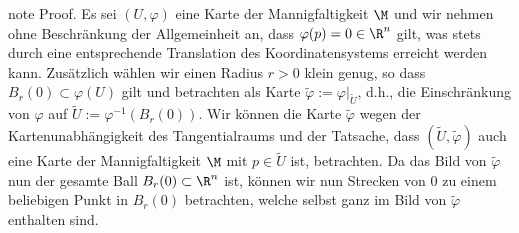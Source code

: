 \documentclass[letterpaper,10pt,german]{jupyterBook}
\begin{document}
\begin{sphinxadmonition}{note}
\sphinxAtStartPar
Proof. Es sei \((U,\varphi)\) eine Karte der Mannigfaltigkeit \(\M\) und wir nehmen ohne Beschränkung der Allgemeinheit an, dass \(\varphi(p)=0 \in \R^n\) gilt, was stets durch eine entsprechende Translation des Koordinatensystems erreicht werden kann.
Zusätzlich wählen wir einen Radius \(r>0\) klein genug, so dass \(B_r(0) \subset \varphi(U)\) gilt und betrachten als Karte \(\tilde{\varphi} := \varphi\rvert_{\tilde{U}}\), d.h., die Einschränkung von \(\varphi\) auf \(\tilde{U}:= \varphi^{-1}(B_r(0))\).
Wir können die Karte \(\tilde{\varphi}\) wegen der Kartenunabhängigkeit des Tangentialraums und der Tatsache, dass \((\tilde{U},\tilde{\varphi})\) auch eine Karte der Mannigfaltigkeit \(\M\) mit \(p\in \tilde{U}\) ist, betrachten.
Da das Bild von \(\tilde{\varphi}\) nun der gesamte Ball \(B_r(0) \subset \R^n\) ist, können wir nun Strecken von \(0\) zu einem beliebigen Punkt in \(B_r(0)\) betrachten, welche selbst ganz im Bild von \(\tilde{\varphi}\) enthalten sind.


\end{sphinxadmonition}
\end{document}
